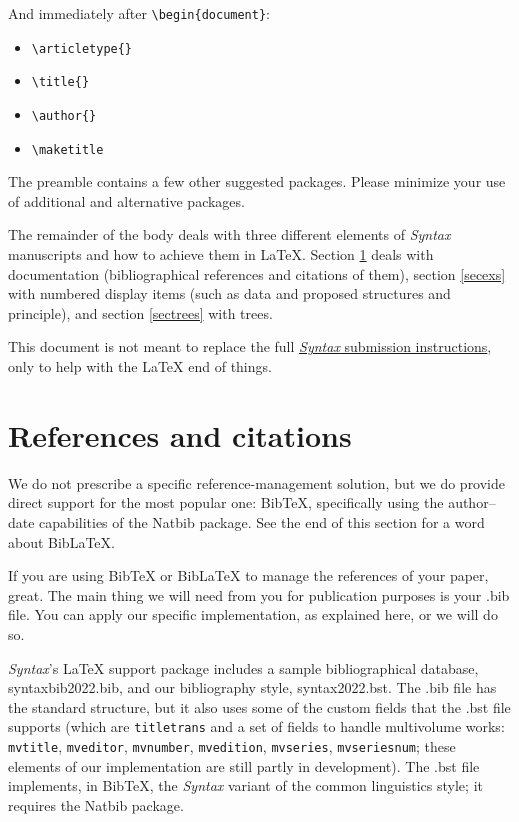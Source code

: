 \documentclass[letterpaper,12pt, twoside]{article}
\begin{document}
And immediately after \verb|\begin{document}|:

\begin{itemize}
\item\verb|\articletype{}|
\item\verb|\title{}|
\item\verb|\author{}|
\item\verb|\maketitle|
\end{itemize}

The preamble contains a few other suggested packages. Please minimize your use of additional and alternative packages.

The remainder of the body deals with three different elements of \emph{Syntax} manuscripts and how to achieve them in LaTeX. Section  \ref{secbib} deals with documentation (bibliographical references and citations of them), section \ref{secexs} with numbered display items (such as data and proposed structures and principle), and section \ref{sectrees} with trees.  

This document is not meant to replace the full \href{https://docs.google.com/document/d/1T0zHwq2b53VnqF18c8PKd-W_FWKqhKF0gkbBndoxj28/edit?usp=sharing}{\emph{Syntax} submission instructions}, only to help with the LaTeX end of things.


\section{References and citations}\label{secbib}
We do not prescribe a specific reference-management solution, but we do provide direct support for the most popular one: BibTeX, specifically using the author--date capabilities of the Natbib package. See the end of this section for a word about BibLaTeX.

If you are using BibTeX or BibLaTeX to manage the references of your paper, great. The main thing we will need from you for publication purposes is your .bib file. You can apply our specific implementation, as explained here, or we will do so. 

\emph{Syntax}'s LaTeX support package includes a sample bibliographical database, syntaxbib2022.bib, and our bibliography style, syntax2022.bst. The .bib file has the standard structure, but it also uses some of the custom fields that the .bst file supports (which are \verb|titletrans| and a set of fields to handle multivolume works: \verb|mvtitle|, \verb|mveditor|, \verb|mvnumber|, \verb|mvedition|, \verb|mvseries|, \verb|mvseriesnum|; these elements of our implementation are still partly in development).
The .bst file implements, in BibTeX, the \emph{Syntax} variant of the common linguistics style; it requires the Natbib package. 
\end{document}
